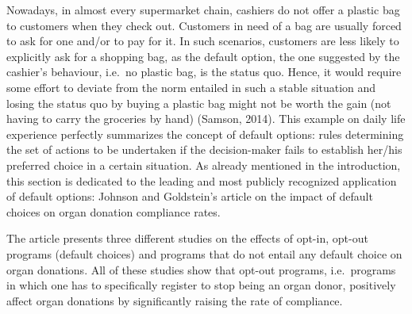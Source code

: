 \documentclass[]{article}
\begin{document}
Nowadays, in almost every supermarket chain, cashiers do not offer a
plastic bag to customers when they check out. Customers in need of a bag
are usually forced to ask for one and/or to pay for it. In such
scenarios, customers are less likely to explicitly ask for a shopping
bag, as the default option, the one suggested by the cashier's
behaviour, i.e.~no plastic bag, is the status quo. Hence, it would
require some effort to deviate from the norm entailed in such a stable
situation and losing the status quo by buying a plastic bag might not be
worth the gain (not having to carry the groceries by hand) (Samson,
2014). This example on daily life experience perfectly summarizes the
concept of default options: rules determining the set of actions to be
undertaken if the decision-maker fails to establish her/his preferred
choice in a certain situation. As already mentioned in the introduction,
this section is dedicated to the leading and most publicly recognized
application of default options: Johnson and Goldstein's article on the
impact of default choices on organ donation compliance rates.

The article presents three different studies on the effects of opt-in,
opt-out programs (default choices) and programs that do not entail any
default choice on organ donations. All of these studies show that
opt-out programs, i.e.~programs in which one has to specifically
register to stop being an organ donor, positively affect organ donations
by significantly raising the rate of compliance.
\end{document}
